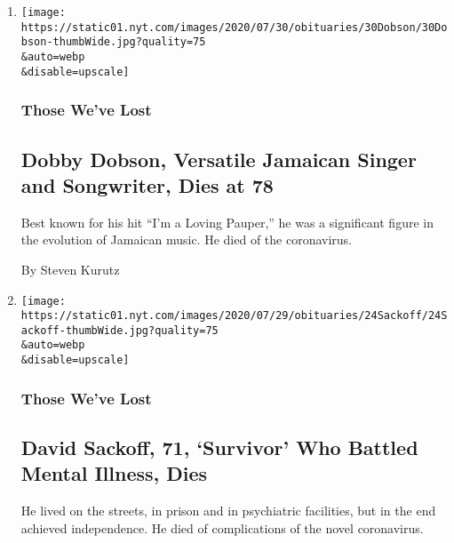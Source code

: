 \begin{enumerate}
\def\labelenumi{\arabic{enumi}.}
\item
  \href{/2020/07/31/obituaries/dobby-dobson-dead-coronavirus.html}{}

  \texttt{[image: https://static01.nyt.com/images/2020/07/30/obituaries/30Dobson/30Dobson-thumbWide.jpg?quality=75\\\&auto=webp\\\&disable=upscale]}

  \hypertarget{those-weve-lost}{%
  \subsubsection{Those We've Lost}\label{those-weve-lost}}

  \hypertarget{dobby-dobson-versatile-jamaican-singer-and-songwriter-dies-at-78}{%
  \subsection{Dobby Dobson, Versatile Jamaican Singer and Songwriter,
  Dies at
  78}\label{dobby-dobson-versatile-jamaican-singer-and-songwriter-dies-at-78}}

  Best known for his hit ``I'm a Loving Pauper,'' he was a significant
  figure in the evolution of Jamaican music. He died of the coronavirus.

  By Steven Kurutz
\item
  \href{/2020/07/25/obituaries/david-sackoff-dead-coronavirus.html}{}

  \texttt{[image: https://static01.nyt.com/images/2020/07/29/obituaries/24Sackoff/24Sackoff-thumbWide.jpg?quality=75\\\&auto=webp\\\&disable=upscale]}

  \hypertarget{those-weve-lost-1}{%
  \subsubsection{Those We've Lost}\label{those-weve-lost-1}}

  \hypertarget{david-sackoff-71-survivor-who-battled-mental-illness-dies}{%
  \subsection{David Sackoff, 71, `Survivor' Who Battled Mental Illness,
  Dies}\label{david-sackoff-71-survivor-who-battled-mental-illness-dies}}

  He lived on the streets, in prison and in psychiatric facilities, but
  in the end achieved independence. He died of complications of the
  novel coronavirus.


\end{enumerate}
